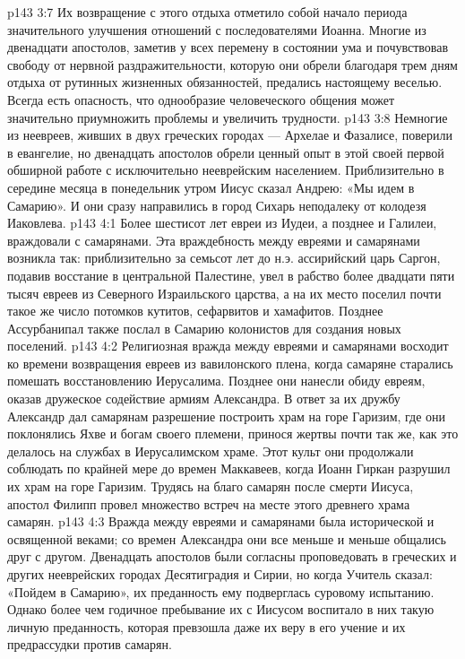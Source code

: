 \vs p143 3:7 Их возвращение с этого отдыха отметило собой начало периода значительного улучшения отношений с последователями Иоанна. Многие из двенадцати апостолов, заметив у всех перемену в состоянии ума и почувствовав свободу от нервной раздражительности, которую они обрели благодаря трем дням отдыха от рутинных жизненных обязанностей, предались настоящему веселью. Всегда есть опасность, что однообразие человеческого общения может значительно приумножить проблемы и увеличить трудности.
\vs p143 3:8 \pc Немногие из неевреев, живших в двух греческих городах --- Архелае и Фазалисе, поверили в евангелие, но двенадцать апостолов обрели ценный опыт в этой своей первой обширной работе с исключительно нееврейским населением. Приблизительно в середине месяца в понедельник утром Иисус сказал Андрею: «Мы идем в Самарию». И они сразу направились в город Сихарь неподалеку от колодезя Иаковлева.
\vs p143 4:1 Более шестисот лет евреи из Иудеи, а позднее и Галилеи, враждовали с самарянами. Эта враждебность между евреями и самарянами возникла так: приблизительно за семьсот лет до н.э. ассирийский царь Саргон, подавив восстание в центральной Палестине, увел в рабство более двадцати пяти тысяч евреев из Северного Израильского царства, а на их место поселил почти такое же число потомков кутитов, сефарвитов и хамафитов. Позднее Ассурбанипал также послал в Самарию колонистов для создания новых поселений.
\vs p143 4:2 Религиозная вражда между евреями и самарянами восходит ко времени возвращения евреев из вавилонского плена, когда самаряне старались помешать восстановлению Иерусалима. Позднее они нанесли обиду евреям, оказав дружеское содействие армиям Александра. В ответ за их дружбу Александр дал самарянам разрешение построить храм на горе Гаризим, где они поклонялись Яхве и богам своего племени, принося жертвы почти так же, как это делалось на службах в Иерусалимском храме. Этот культ они продолжали соблюдать по крайней мере до времен Маккавеев, когда Иоанн Гиркан разрушил их храм на горе Гаризим. Трудясь на благо самарян после смерти Иисуса, апостол Филипп провел множество встреч на месте этого древнего храма самарян.
\vs p143 4:3 Вражда между евреями и самарянами была исторической и освященной веками; со времен Александра они все меньше и меньше общались друг с другом. Двенадцать апостолов были согласны проповедовать в греческих и других нееврейских городах Десятиградия и Сирии, но когда Учитель сказал: «Пойдем в Самарию», их преданность ему подверглась суровому испытанию. Однако более чем годичное пребывание их с Иисусом воспитало в них такую личную преданность, которая превзошла даже их веру в его учение и их предрассудки против самарян.
